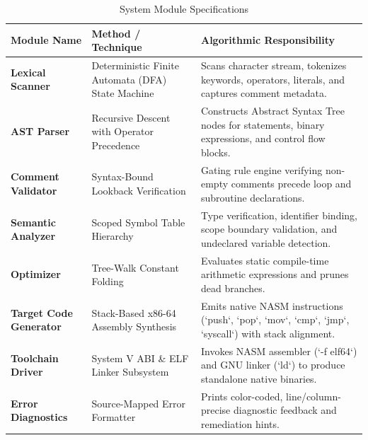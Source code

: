 \begin{table}[h!]
\centering
\caption{System Module Specifications} \label{tab:system_modules}
\begin{tabular}{|p{3.2cm}|p{3.8cm}|p{7.5cm}|}
\hline
\textbf{Module Name} & \textbf{Method / Technique} & \textbf{Algorithmic Responsibility} \\
\hline
\textbf{Lexical Scanner} & Deterministic Finite Automata (DFA) State Machine & Scans character stream, tokenizes keywords, operators, literals, and captures comment metadata. \\ \hline
\textbf{AST Parser} & Recursive Descent with Operator Precedence & Constructs Abstract Syntax Tree nodes for statements, binary expressions, and control flow blocks. \\ \hline
\textbf{Comment Validator} & Syntax-Bound Lookback Verification & Gating rule engine verifying non-empty comments precede loop and subroutine declarations. \\ \hline
\textbf{Semantic Analyzer} & Scoped Symbol Table Hierarchy & Type verification, identifier binding, scope boundary validation, and undeclared variable detection. \\ \hline
\textbf{Optimizer} & Tree-Walk Constant Folding & Evaluates static compile-time arithmetic expressions and prunes dead branches. \\ \hline
\textbf{Target Code Generator} & Stack-Based x86-64 Assembly Synthesis & Emits native NASM instructions (`push`, `pop`, `mov`, `cmp`, `jmp`, `syscall`) with stack alignment. \\ \hline
\textbf{Toolchain Driver} & System V ABI \& ELF Linker Subsystem & Invokes NASM assembler (`-f elf64`) and GNU linker (`ld`) to produce standalone native binaries. \\ \hline
\textbf{Error Diagnostics} & Source-Mapped Error Formatter & Prints color-coded, line/column-precise diagnostic feedback and remediation hints. \\ \hline
\end{tabular}
\end{table}

\newpage
